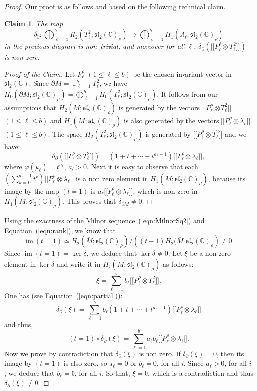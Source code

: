 \documentclass[a4paper]{amsart}
\theoremstyle{plain}
\newtheorem{claim}[theorem]{Claim}
\theoremstyle{definition}
\theoremstyle{remark}
\newcommand{\myleq}{\leqslant}
\newcommand{\CC}{{\mathbb C}}
\newcommand{\im}{\mathop{\mathrm{im}}\nolimits}
\newcommand{\sll}{\mathfrak{sl}_2(\CC)}
\newcommand{\sllrho}{\mathfrak{sl}_2(\CC)_\rho}
\newcommand{\bbrack}[1]{\lbrack \! \lbrack #1 \rbrack \! \rbrack}
\newcommand{\bord}{\partial}
\newcommand{\infcover}[1]{\overline{#1}}
\begin{document}
\begin{proof}[Proof]
Our proof is as follows and based on the following technical claim.
\begin{claim}\label{claim:map_Delta}
  The map 
  $$\delta_{\bord} : 
    \bigoplus_{\ell=1}^{b} H_2(T_\ell^2; \sllrho) \to
    \bigoplus_{\ell=1}^{b} H_1(A_\ell; \sllrho)$$
  in the previous diagram is
  non--trivial, and moreover for all $\ell$, 
  $\delta_{\bord}\left( \bbrack{P_\ell^\rho \otimes T^2_\ell} \right)$  
  is non zero.
\end{claim}
\begin{proof}[Proof of the Claim]
  Let $P_\ell^\rho$ $(1 \myleq \ell \myleq b)$ be the chosen invariant
  vector in $\sll$.  Since $\bord M = \cup_{\ell=1}^b T^2_\ell$, we
  have $H_0(\partial M; \sllrho) = \bigoplus_{\ell=1}^{b}
  H_0(T^2_\ell; \sllrho).$ It follows from our assumptions that
  $H_2(M; \sllrho)$ is generated by the vectors $\bbrack{P_\ell^\rho
    \otimes T^2_\ell}$ $(1 \myleq \ell \myleq b)$ and $H_1(M;
  \sllrho)$ is also generated by the vectors $\bbrack{P^\rho_\ell
    \otimes \lambda_\ell}$ $(1 \myleq \ell \myleq b)$.  The space
  $H_2(T_\ell^2; \sllrho)$ is generated by $\bbrack{P_\ell^\rho
    \otimes T^2_\ell}$ and we have:
  \begin{equation}\label{eqn:partial}
    \delta_{\partial}\left( 
      \bbrack{P_\ell^\rho \otimes T^2_\ell} 
     \right) = 
       (1 + t + \cdots + t^{a_\ell - 1})
       \bbrack{P^\rho_\ell \otimes \lambda_\ell},
  \end{equation}
  where $\varphi(\mu_\ell) = t^{a_\ell}$, $a_\ell>0$.  Next it is easy to observe
  that each $(\sum_{k=0}^{a_\ell - 1} t^k) \bbrack{P^\rho_\ell \otimes \lambda_\ell}$ 
  is a non zero element in $H_1(\infcover{M}; \sllrho)$,
  because its image by the map $(t=1)$ is 
  $a_\ell \bbrack{P^\rho_\ell \otimes \lambda_\ell}$, 
  which is non zero in $H_1(M; \sllrho)$. 
  This proves that $\delta_{\bord M} \ne 0$.
\end{proof}

Using the exactness of the Milnor sequence~(\ref{eqn:MilnorSq2}) and
 Equation~(\ref{eqn:rank}), we know that
$$
\im (t=1) \simeq 
  H_2(\infcover{M}; \sllrho)/{\left( {(t-1)H_2(\infcover{M}; \sllrho} \right)} \ne 0.
$$ 
Since $\im (t=1) = \ker \delta$, we deduce that $\ker \delta \ne 0$. 
Let $\xi$ be a non zero element in $\ker \delta$ and write it in
$H_2(M; \sllrho)$ as follows:
\[
\xi = \sum_{\ell=1}^{b} b_\ell \bbrack{P^\rho_\ell \otimes T^2_\ell}.
\]
One has (see Equation~(\ref{eqn:partial})):
\[
\delta_{\partial}(\xi) = 
\sum_{\ell=1}^{b} b_\ell
(1 + t + \cdots + t^{a_\ell - 1})
\bbrack{P^\rho_\ell \otimes \lambda_\ell}
\]
and thus,
\[
(t=1) \circ \delta_{\partial} (\xi) = 
  \sum_{\ell=1}^{b} a_\ell b_\ell \bbrack{P^\rho_\ell \otimes \lambda_\ell}.
\]
Now we prove by contradiction that $\delta_{\partial}(\xi)$ is non
zero. If $\delta_{\partial}(\xi) = 0$, then its image by $(t=1)$ is
also zero, so $a_\ell = 0$ or $b_\ell = 0$, for all $i$. Since $a_\ell > 0$,
for all $i$, we deduce that $b_\ell = 0$, for all $i$. So that, $\xi =
0$, which is a contradiction and thus $\delta_{\partial}(\xi) \ne 0$.


\end{proof}
\end{document}

